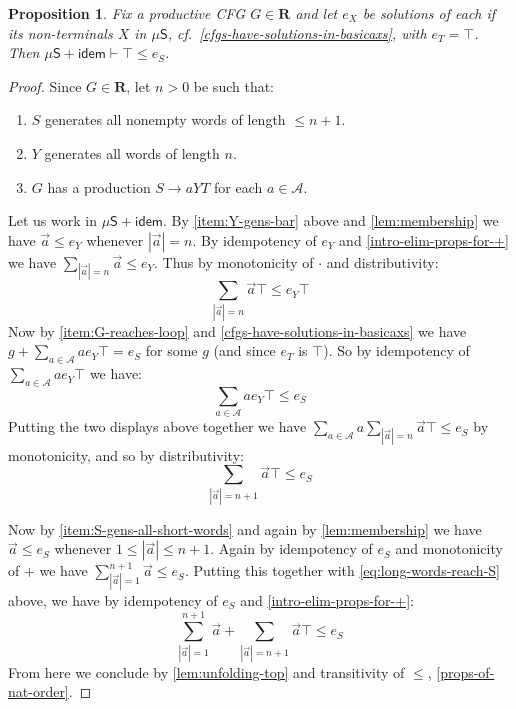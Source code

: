 \documentclass[a4paper,10pt]{amsart}
\newtheorem{proposition}[theorem]{Proposition}
\theoremstyle{definition}
\newcommand{\purple}[1]{{\color{purple}#1}}
\newcommand{\Alphabet}{\mathcal{A}}
\newcommand{\proves}{\vdash}
\newcommand{\basicax}{\mu\mathsf{S}}
\newcommand{\idem}{\mathsf{idem}}
\begin{document}
\begin{proposition}
\label{reg-tot-provable-with-idem}
    Fix a productive CFG $G \in \mathbf R$ and let $e_X$ be solutions of each if its non-terminals $X$ in $\basicax$, cf.~\cref{cfgs-have-solutions-in-basicaxs}, with $e_T = \top$. 
    Then $\basicax + \idem \proves \top \leq e_S$.
\end{proposition}
\begin{proof}
Since $G\in \mathbf R$, let $n>0$ be such that:
\begin{enumerate}
    \item\label{item:S-gens-all-short-words} $S$ generates all nonempty words of length $\leq  n+1$.
    \item\label{item:Y-gens-bar} $Y$ generates all words of length $n$.
    \item\label{item:G-reaches-loop} $G$ has a production $S \to aYT$ for each $a \in \Alphabet$.
\end{enumerate}
    Let us work in $\basicax + \idem$. 
    By \eqref{item:Y-gens-bar} above and \cref{lem:membership} we have
    $ \vec a \leq e_Y$ whenever $|\vec a| = n$.
    By \purple{idempotency of $e_Y$} and \cref{intro-elim-props-for-+} we have $\sum\limits_{|\vec a| = n}\vec a \leq e_Y $.
    Thus by monotonicity of $\cdot$ and distributivity:
    $$\sum\limits_{|\vec a| = n}\vec a \top \leq e_Y\top$$
    Now by \eqref{item:G-reaches-loop} and \cref{cfgs-have-solutions-in-basicaxs} we have $g + \sum\limits_{a \in \Alphabet}ae_Y\top = e_S$ for some $g$ (and since $e_T$ is $\top$).
    So by \purple{idempotency of $\sum\limits_{a \in \Alphabet}ae_Y\top$} we have:
    $$\sum\limits_{a \in \Alphabet} ae_Y\top \leq e_S$$
    Putting the two displays above together we have $\sum\limits_{a \in \Alphabet} a\sum\limits_{|\vec a| = n}\vec a \top \leq e_S$ by monotonicity, and so by distributivity:
    \begin{equation}
    \label{eq:long-words-reach-S}
        \sum\limits_{|\vec a| = n+1}\vec a \top \leq e_S
    \end{equation}
    
    Now by \eqref{item:S-gens-all-short-words} and again by \cref{lem:membership} we have $\vec a \leq e_S$ whenever $1 \leq |\vec a|\leq n+1$. 
    Again by \purple{idempotency of $e_S$} and monotonicity of $+$ we have 
    $\sum\limits_{|\vec a|=1}^{n+1} \vec a \leq e_S$.
    Putting this together with \eqref{eq:long-words-reach-S} above, we have \purple{by idempotency of $e_S$} and \cref{intro-elim-props-for-+}:
    $$\sum\limits_{|\vec a|=1}^{n+1} \vec a  + \sum\limits_{|\vec a| = n+1}\vec a \top \leq e_S$$
    From here we conclude by \cref{lem:unfolding-top} and transitivity of $\leq$, \cref{props-of-nat-order}.
\end{proof}
\end{document}
